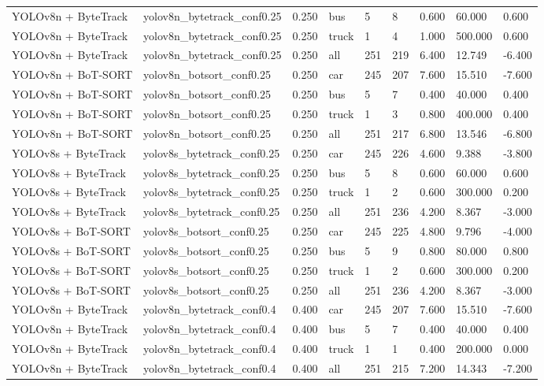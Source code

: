 \begin{tabular}{lllllllll}
YOLOv8n + ByteTrack & yolov8n\_bytetrack\_conf0.25 & 0.250 & bus & 5 & 8 & 0.600 & 60.000 & 0.600 \\
YOLOv8n + ByteTrack & yolov8n\_bytetrack\_conf0.25 & 0.250 & truck & 1 & 4 & 1.000 & 500.000 & 0.600 \\
YOLOv8n + ByteTrack & yolov8n\_bytetrack\_conf0.25 & 0.250 & all & 251 & 219 & 6.400 & 12.749 & -6.400 \\
YOLOv8n + BoT-SORT & yolov8n\_botsort\_conf0.25 & 0.250 & car & 245 & 207 & 7.600 & 15.510 & -7.600 \\
YOLOv8n + BoT-SORT & yolov8n\_botsort\_conf0.25 & 0.250 & bus & 5 & 7 & 0.400 & 40.000 & 0.400 \\
YOLOv8n + BoT-SORT & yolov8n\_botsort\_conf0.25 & 0.250 & truck & 1 & 3 & 0.800 & 400.000 & 0.400 \\
YOLOv8n + BoT-SORT & yolov8n\_botsort\_conf0.25 & 0.250 & all & 251 & 217 & 6.800 & 13.546 & -6.800 \\
YOLOv8s + ByteTrack & yolov8s\_bytetrack\_conf0.25 & 0.250 & car & 245 & 226 & 4.600 & 9.388 & -3.800 \\
YOLOv8s + ByteTrack & yolov8s\_bytetrack\_conf0.25 & 0.250 & bus & 5 & 8 & 0.600 & 60.000 & 0.600 \\
YOLOv8s + ByteTrack & yolov8s\_bytetrack\_conf0.25 & 0.250 & truck & 1 & 2 & 0.600 & 300.000 & 0.200 \\
YOLOv8s + ByteTrack & yolov8s\_bytetrack\_conf0.25 & 0.250 & all & 251 & 236 & 4.200 & 8.367 & -3.000 \\
YOLOv8s + BoT-SORT & yolov8s\_botsort\_conf0.25 & 0.250 & car & 245 & 225 & 4.800 & 9.796 & -4.000 \\
YOLOv8s + BoT-SORT & yolov8s\_botsort\_conf0.25 & 0.250 & bus & 5 & 9 & 0.800 & 80.000 & 0.800 \\
YOLOv8s + BoT-SORT & yolov8s\_botsort\_conf0.25 & 0.250 & truck & 1 & 2 & 0.600 & 300.000 & 0.200 \\
YOLOv8s + BoT-SORT & yolov8s\_botsort\_conf0.25 & 0.250 & all & 251 & 236 & 4.200 & 8.367 & -3.000 \\
YOLOv8n + ByteTrack & yolov8n\_bytetrack\_conf0.4 & 0.400 & car & 245 & 207 & 7.600 & 15.510 & -7.600 \\
YOLOv8n + ByteTrack & yolov8n\_bytetrack\_conf0.4 & 0.400 & bus & 5 & 7 & 0.400 & 40.000 & 0.400 \\
YOLOv8n + ByteTrack & yolov8n\_bytetrack\_conf0.4 & 0.400 & truck & 1 & 1 & 0.400 & 200.000 & 0.000 \\
YOLOv8n + ByteTrack & yolov8n\_bytetrack\_conf0.4 & 0.400 & all & 251 & 215 & 7.200 & 14.343 & -7.200 \\

\end{tabular}

